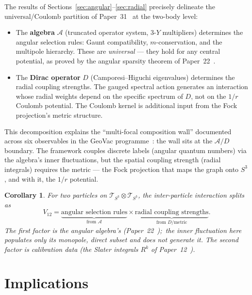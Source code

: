 \documentclass[twocolumn,pra,amsmath,amssymb,superscriptaddress]{revtex4-2}
\newtheorem{corollary}[theorem]{Corollary}
\begin{document}
The results of Sections~\ref{sec:angular}--\ref{sec:radial} precisely
delineate the universal/Coulomb partition of
Paper~31~\cite{paper31} at the two-body level:

\begin{itemize}
\item The \textbf{algebra} $\mathcal{A}$ (truncated operator system,
  $3$-$Y$ multipliers) determines the angular selection rules: Gaunt
  compatibility, $m$-conservation, and the multipole hierarchy.
  These are \emph{universal} --- they hold for any central potential,
  as proved by the angular sparsity theorem of
  Paper~22~\cite{paper22}.

\item The \textbf{Dirac operator} $D$ (Camporesi--Higuchi eigenvalues)
  determines the radial coupling strengths. The gauged spectral action
  generates an interaction whose radial weights depend on the specific
  spectrum of $D$, not on the $1/r$ Coulomb potential. The Coulomb
  kernel is additional input from the Fock projection's metric
  structure.
\end{itemize}

This decomposition explains the ``multi-focal composition wall''
documented across six observables in the GeoVac
programme~\cite{paper34}: the wall sits at the $\mathcal{A}/D$
boundary. The framework couples discrete labels (angular quantum
numbers) via the algebra's inner fluctuations, but the spatial
coupling strength (radial integrals) requires the metric --- the Fock
projection that maps the graph onto $S^3$, and with it, the $1/r$
potential.

\begin{corollary}
For two particles on $\mathcal{T}_{S^3} \otimes \mathcal{T}_{S^3}$,
the inter-particle interaction splits as
\begin{equation}
  V_{12} = \underbrace{\text{angular selection
      rules}}_{\text{from } \mathcal{A}} \times
  \underbrace{\text{radial coupling
      strengths}}_{\text{from } D / \text{metric}}.
  \label{eq:AD_split}
\end{equation}
The first factor is the angular algebra's (Paper~22~\cite{paper22});\
the inner fluctuation here populates only its monopole, direct subset
and does not generate it. The second factor is calibration data (the Slater
integrals $R^k$ of Paper~12~\cite{paper12}).
\end{corollary}

\section{Implications}
\label{sec:implications}
\end{document}

